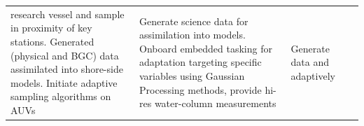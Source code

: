 \begin{longtable}{|p{3cm}|p{4cm}|p{4cm}|p{4cm}|}
                                                        research vessel
                                                        and sample in
                                                        proximity of
                                                        key
                                                        stations.
                                                        Generated
                                                        (physical and
                                                        BGC) data
                                                        assimilated into
                                                        shore-side
                                                        models. Initiate
                                                        adaptive sampling algorithms on
                                                        AUVs&Generate
                                                              science
                                                              data for
                                                              assimilation
                                                              into
                                                              models.
                                                              Onboard
                                                              embedded
                                                              tasking
                                                              for
                                                              adaptation
                                                              targeting
                                                              specific
                                                              variables
                                                              using
                                                              Gaussian
                                                              Processing
                                                              methods\cite{fossum19,fossum21},
                                                              provide hi-res
                                                              water-column
                                                              measurements&Generate
                                                                            data
                                                                            and
                                                                            adaptively

\end{longtable}
